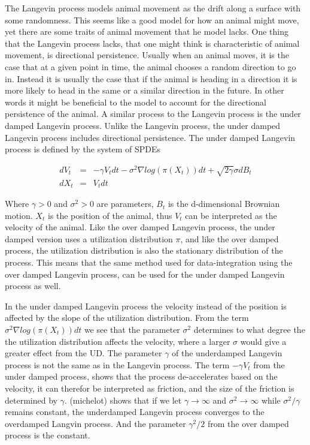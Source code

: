 
The Langevin process models animal movement as the drift along a surface with some randomness. This seems like a good model for how an animal might move, yet there are some traits of animal movement that he model lacks. One thing that the Langevin process lacks, that one might think is characteristic of animal movement, is directional persistence. Usually when an animal moves, it is the case that at a given point in time, the animal chooses a random direction to go in. Instead it is usually the case that if the animal is heading in a direction it is more likely to head in the same or a similar direction in the future. In other words it might be beneficial to the model to account for the directional persistence of the animal. A similar process to the Langevin process is the under damped Langevin process. Unlike the Langevin process, the under damped Langevin process includes directional persistence. The under damped Langevin process is defined by the system of SPDEs

$$
\begin{array}{lcl} dV_t & = & -\gamma V_t dt - \sigma^2 \nabla log(\pi(X_t))dt + \sqrt{2\gamma}\sigma dB_t \\ dX_t & = & V_t dt \end{array}
$$

Where $\gamma > 0$ and $\sigma^2 > 0$ are parameters, $B_t$ is the d-dimensional Brownian motion. $X_t$ is the position of the animal, thus $V_t$ can be interpreted as the velocity of the animal. Like the over damped Langevin process, the under damped version uses a utilization distribution $\pi$, and like the over damped process, the utilization distribution is also the stationary distribution of the process. This means that the same method used for data-integration using the over damped Langevin process, can be used for the under damped Langevin process as well.

In the under damped Langevin process the velocity instead of the position is affected by the slope of the utilization distribution. From the term $\sigma^2 \nabla log(\pi(X_t))dt$ we see that the parameter $\sigma^2$ determines to what degree the the utilization distribution affects the velocity, where a larger $\sigma$ would give a greater effect from the UD. The parameter $\gamma$ of the underdamped Langevin process is not the same as in the Langevin process. The term $-\gamma V_t$ from the under damped process, shows that the process de-accelerates based on the velocity, it can therefor be interpreted as friction, and the size of the friction is determined by $\gamma$. (michelot) shows that if we let $\gamma \rightarrow \infty$ and $\sigma^2 \rightarrow \infty$ while $\sigma^2/\gamma$ remains constant, the underdamped Langevin process converges to the overdamped Langvin process. And the parameter $\gamma^2/2$ from the over damped process is the constant.






